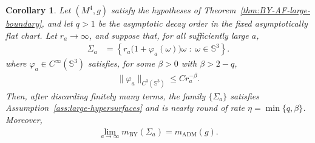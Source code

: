 \documentclass[10pt,a4paper]{amsart}
\newcommand{\Sph}{\mathbb{S}}
\newcommand{\ADM}{\mathrm{ADM}}
\newcommand{\BY}{\mathrm{BY}}
\newtheorem{corollary}[theorem]{Corollary}
\begin{document}
	

	\begin{corollary}
		Let $(M^4,g)$ satisfy the hypotheses of
		Theorem~\ref{thm:BY-AF-large-boundary}, and let $q>1$ be the
		asymptotic decay order in the fixed asymptotically flat chart.
		Let $r_a\to\infty$, and suppose that, for all sufficiently large $a$,
		\begin{align*}
			\Sigma_a
			&=
			\left\{
			r_a\bigl(1+\varphi_a(\omega)\bigr)\omega
			\;:\;
			\omega\in \Sph^3
			\right\}.
		\end{align*}
		where $\varphi_a\in C^\infty(\Sph^3)$ satisfies, for some $\beta>0$
		with $\beta>2-q$,
		\begin{align*}
			\|\varphi_a\|_{C^3(\Sph^3)}
			\leq
			Cr_a^{-\beta}.
		\end{align*}
		Then, after discarding finitely many terms, the family
		$\{\Sigma_a\}$ satisfies Assumption~\ref{ass:large-hypersurfaces} and
		is nearly round of rate $\eta=\min\{q,\beta\}$. Moreover,
		\begin{align*}
			\lim_{a\to\infty}m_{\BY}(\Sigma_a)
			=
			m_{\ADM}(g).
		\end{align*}
	\end{corollary}
\end{document}
